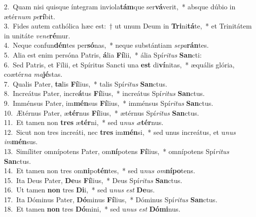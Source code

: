 {2.~}Quam nisi quisque íntegram inviola\textbf{tám}que ser\textbf{vá}verit,~* absque dúbio in ætér\textit{num} \textit{pe}\textbf{rí}bit.\\
{3.~}Fides autem cathólica hæc est:~† ut unum Deum in \textbf{Tri}ni\textbf{tá}te,~* et Trinitátem in unitáte \textit{ve}\textit{ne}\textbf{ré}mur.\\
{4.~}Neque confun\textbf{dén}tes per\textbf{só}nas,~* neque substántiam \textit{se}\textit{pa}\textbf{rán}tes.\\
{5.~}Alia est enim persóna Patris, \textbf{á}lia \textbf{Fí}lii,~* ália Spí\textit{ri}\textit{tus} \textbf{San}cti:\\
{6.~}Sed Patris, et Fílii, et Spíritus Sancti una \textbf{est} di\textbf{ví}nitas,~* æquális glória, coætér\textit{na} \textit{ma}\textbf{jé}stas.\\
{7.~}Qualis Pater, \textbf{ta}lis \textbf{Fí}lius,~* talis Spí\textit{ri}\textit{tus} \textbf{San}ctus.\\
{8.~}Increátus Pater, incre\textbf{á}tus \textbf{Fí}lius,~* increátus Spí\textit{ri}\textit{tus} \textbf{San}ctus.\\
{9.~}Imménsus Pater, im\textbf{mén}sus \textbf{Fí}lius,~* imménsus Spí\textit{ri}\textit{tus} \textbf{San}ctus.\\
{10.~}Ætérnus Pater, æ\textbf{tér}nus \textbf{Fí}lius,~* ætérnus Spí\textit{ri}\textit{tus} \textbf{San}ctus.\\
{11.~}Et tamen non \textbf{tres} æ\textbf{tér}ni,~* sed u\textit{nus} \textit{æ}\textbf{tér}nus.\\
{12.~}Sicut non tres increáti, nec \textbf{tres} im\textbf{mén}si,~* sed unus increátus, et u\textit{nus} \textit{im}\textbf{mén}sus.\\
{13.~}Simíliter omnípotens Pater, om\textbf{ní}potens \textbf{Fí}lius,~* omnípotens Spí\textit{ri}\textit{tus} \textbf{San}ctus.\\
{14.~}Et tamen non tres om\textbf{ni}po\textbf{tén}tes,~* sed u\textit{nus} \textit{om}\textbf{ní}\textbf{po}tens.\\
{15.~}Ita Deus Pater, \textbf{De}us \textbf{Fí}lius,~* Deus Spí\textit{ri}\textit{tus} \textbf{San}ctus.\\
{16.~}Ut tamen \textbf{non} tres \textbf{Di}i,~* sed u\textit{nus} \textit{est} \textbf{De}us.\\
{17.~}Ita Dóminus Pater, \textbf{Dó}minus \textbf{Fí}lius,~* Dóminus Spí\textit{ri}\textit{tus} \textbf{San}ctus.\\
{18.~}Et tamen \textbf{non} tres \textbf{Dó}mini,~* sed u\textit{nus} \textit{est} \textbf{Dó}\textbf{mi}nus.\\
